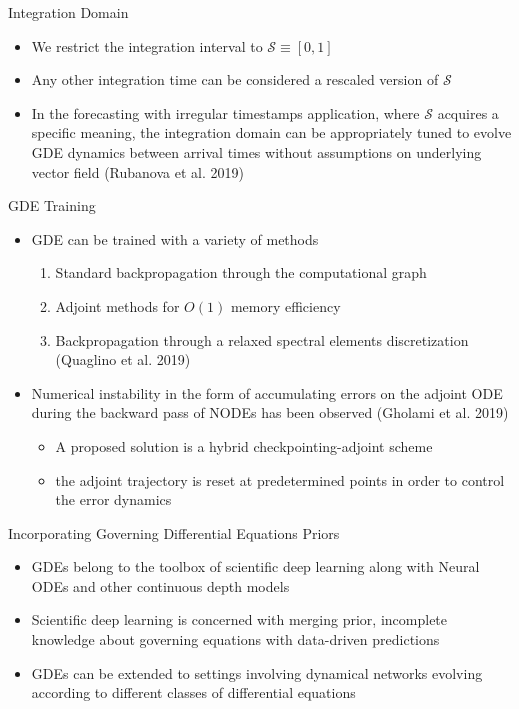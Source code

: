 \documentclass{beamer}
\begin{document}
\begin{frame}{Integration Domain}
\begin{itemize}
\item We restrict the integration interval to $\mathcal S\equiv[0,1]$
\item Any other integration time can be considered a rescaled version of $\mathcal{S}$
\item In the forecasting with irregular timestamps application, where $\mathcal S$ acquires a specific meaning, the integration domain can be appropriately tuned to evolve GDE dynamics between arrival times without assumptions on underlying vector field (Rubanova et al. 2019)
\end{itemize}
\end{frame}

\begin{frame}{GDE Training}
\begin{itemize}
\item GDE can be trained with a variety of methods
\begin{enumerate}
\item Standard backpropagation through the computational graph
\item Adjoint methods for $O(1)$ memory efficiency
\item Backpropagation through a relaxed spectral elements discretization (Quaglino et al. 2019)
\end{enumerate}
\item Numerical instability in the form of accumulating errors on the adjoint ODE during the backward pass of NODEs has been observed (Gholami et al. 2019)
\begin{itemize}
\item A proposed solution is a hybrid checkpointing-adjoint scheme
\item the adjoint trajectory is reset at predetermined points in order to control the error dynamics
\end{itemize}
\end{itemize}
\end{frame}

\begin{frame}{Incorporating Governing Differential Equations Priors}
\begin{itemize}
\item GDEs belong to the toolbox of scientific deep learning along with Neural ODEs and other continuous depth models
\item Scientific deep learning is concerned with merging prior, incomplete knowledge about governing equations with data-driven predictions
\item GDEs can be extended to settings involving dynamical networks evolving according to different classes of differential equations
\end{itemize}
\end{frame}
\end{document}
